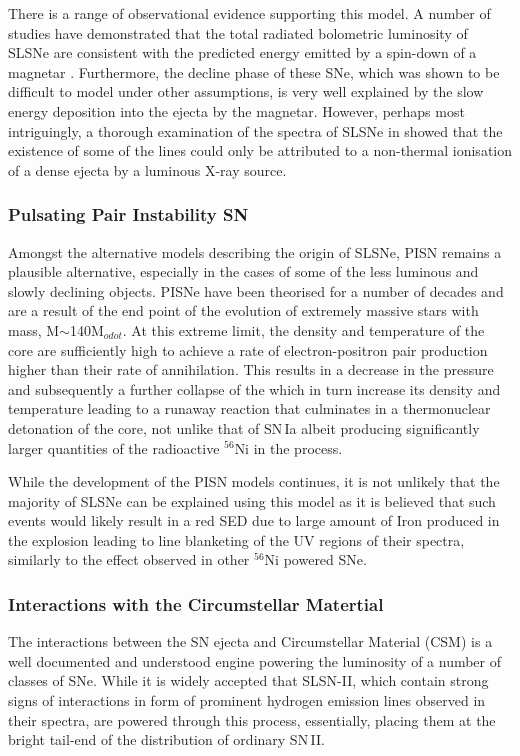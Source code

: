 There is a range of observational evidence supporting this model. A number of studies have demonstrated that the total radiated bolometric luminosity of SLSNe are consistent with the predicted energy emitted by a spin-down of a magnetar \citep{Inserra2013}. Furthermore, the decline phase of these SNe, which was shown to be difficult to model under other assumptions, is very well explained by the slow energy deposition into the ejecta by the magnetar. However, perhaps most intriguingly, a thorough examination of the spectra of SLSNe in \citet{Mazzali2015} showed that the existence of some of the lines could only be attributed to a non-thermal ionisation of a dense ejecta by a luminous X-ray source.

\subsubsection{Pulsating Pair Instability SN}
Amongst the alternative models describing the origin of SLSNe, PISN remains a plausible alternative, especially in the cases of some of the less luminous and slowly declining objects. PISNe have been theorised for a number of decades \citep{Fraley1968} and are a result of the end point of the evolution of extremely massive stars with mass, M$\sim$140M$_{odot}$. At this extreme limit, the density and temperature of the core are sufficiently high to achieve a rate of electron-positron pair production higher than their rate of annihilation. This results in a decrease in the pressure and subsequently a further collapse of the which in turn increase its density and temperature leading to a runaway reaction that culminates in a thermonuclear detonation of the core, not unlike that of SN\,Ia albeit producing significantly larger quantities of the radioactive $^{56}$Ni in the process.

While the development of the PISN models continues, it is not unlikely that the majority of SLSNe can be explained using this model as it is believed \citep{Jerkstrand2016} that such events would likely result in a red SED due to large amount of Iron produced in the explosion leading to line blanketing of the UV regions of their spectra, similarly to the effect observed in other $^{56}$Ni powered SNe.

\subsubsection{Interactions with the Circumstellar Matertial}
The interactions between the SN ejecta and Circumstellar Material (CSM) is a well documented and understood engine powering the luminosity of a number of classes of SNe. While it is widely accepted that SLSN-II, which contain strong signs of interactions in form of prominent hydrogen emission lines observed in their spectra, are powered through this process, essentially, placing them at the bright tail-end of the distribution of ordinary SN\,II.

